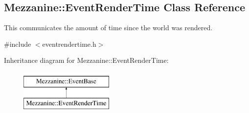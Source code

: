 \hypertarget{classMezzanine_1_1EventRenderTime}{
\subsection{Mezzanine::EventRenderTime Class Reference}
\label{classMezzanine_1_1EventRenderTime}
}


This communicates the amount of time since the world was rendered.  




{\ttfamily \#include $<$eventrendertime.h$>$}

Inheritance diagram for Mezzanine::EventRenderTime:\begin{figure}[H]
\begin{center}
\leavevmode
\includegraphics[height=2.000000cm]{classMezzanine_1_1EventRenderTime}
\end{center}
\end{figure}
